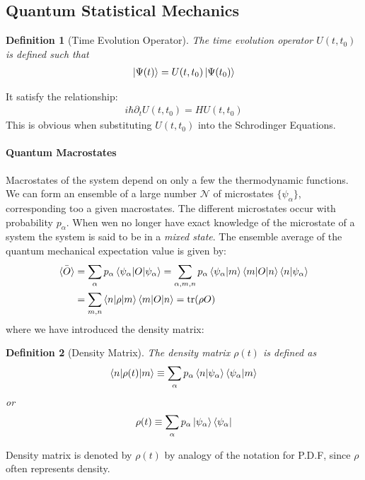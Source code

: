 \documentclass{article}
\numberwithin{equation}{subsection} %
\newtheorem{defi}{Definition}[section]
\theoremstyle{definition}
\begin{document}
    \subsection{Quantum Statistical Mechanics}
    \label{sec:Quantum Statistical Mechanics}
    \begin{defi}[Time Evolution Operator]
        The time evolution operator $U(t,t_0)$ is defined such that
        \begin{align}
            \label{eq:def_time_evo_op}
            \ket{\Psi(t)} = U(t,t_0) \ket{\Psi(t_0)}
        \end{align}
    \end{defi}
    It satisfy the relationship:
    \begin{align}
        \label{eq:def_time_evo_op 2}
        i\hbar \partial_t U(t,t_0)= H U(t,t_0)
    \end{align}
    This is obvious when substituting $U(t,t_0)$ into the Schrodinger 
    Equations.
    
    \paragraph{Quantum Macrostates}
    Macrostates of the system depend on only a few the thermodynamic
    functions. We can form an ensemble of a large number $\mathcal{N}$ of
    microstates $\{\psi_\alpha\}$, corresponding too a given macrostates.
    The different microstates occur with probability $p_\alpha$.
    When wen no longer have exact knowledge of the microstate of a
    system the system is said to be in a \textit{mixed state}.
    The ensemble average of the quantum mechanical expectation
    value is given by:
    \begin{align}
        \label{eq:quantum_macrostates_ensemble_avg}
        \bar{\braket{O}} &= 
            \sum_\alpha p_\alpha \braket{\psi_\alpha|O|\psi_\alpha}
            = \sum_{\alpha,m,n} p_\alpha
                \braket{\psi_\alpha|m}\braket{m|O|n}\braket{n|\psi_\alpha}
                \nonumber\\
            &= \sum_{m,n} \braket{n|\rho|m}\braket{m|O|n}
                = \text{tr}(\rho O)
    \end{align}
    where we have introduced the density matrix:
    \begin{defi}[Density Matrix]
        The density matrix $\rho(t)$ is defined as
        \begin{align}
            \label{eq:density_matrix_def}
        \braket{n|\rho(t)|m} \equiv
        \sum_\alpha p_\alpha \braket{n|\psi_\alpha} \braket{\psi_\alpha|m}
        \end{align}
        or
        \begin{align}
            \label{eq:density_matrix_def_2}
            \rho(t) \equiv \sum_\alpha p_\alpha
                \ket{\psi_\alpha}\bra{\psi_\alpha}
        \end{align}
    \end{defi}
    Density matrix is denoted by $\rho(t)$ by analogy of the notation for
    P.D.F, since $\rho$ often represents density.
    
\end{document}
